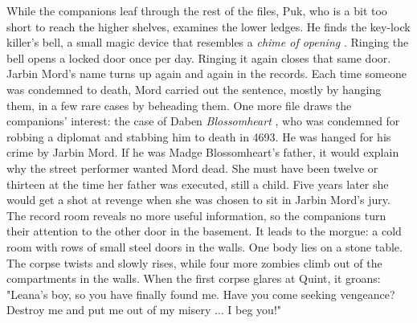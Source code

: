 While the companions leaf through the rest of the files, Puk, who is a bit too short to reach the higher shelves, examines the lower ledges. He finds the key-lock killer's bell, a small magic device that resembles a {\itshape chime of opening} . Ringing the bell opens a locked door once per day. Ringing it again closes that same door. Jarbin Mord's name turns up again and again in the records. Each time someone was condemned to death, Mord carried out the sentence, mostly by hanging them, in a few rare cases by beheading them. One more file draws the companions' interest: the case of Daben {\itshape Blossomheart} , who was condemned for robbing a diplomat and stabbing him to death in 4693. He was hanged for his crime by Jarbin Mord. If he was Madge Blossomheart's father, it would explain why the street performer wanted Mord dead. She must have been twelve or thirteen at the time her father was executed, still a child. Five years later she would get a shot at revenge when she was chosen to sit in Jarbin Mord's jury. The record room reveals no more useful information, so the companions turn their attention to the other door in the basement. It leads to the morgue: a cold room with rows of small steel doors in the walls. One body lies on a stone table. The corpse twists and slowly rises, while four more zombies climb out of the compartments in the walls. When the first corpse glares at Quint, it groans: "Leana's boy, so you have finally found me. Have you come seeking vengeance? Destroy me and put me out of my misery ... I beg you!"\\

